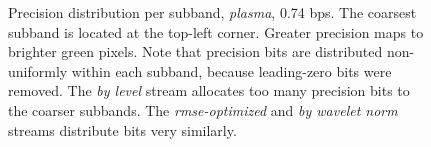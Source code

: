 \begin{figure}[h]
	\centering
	
	\caption{Precision distribution per subband, \emph{plasma}, 0.74 bps. The coarsest subband is located at the top-left corner. Greater precision maps to brighter green pixels. Note that precision bits are distributed non-uniformly within each subband, because leading-zero bits were removed. The \emph{by level} stream allocates too many precision bits to the coarser subbands. The \emph{rmse-optimized} and \emph{by wavelet norm} streams distribute bits very similarly.}
 	\label{fig:precision-map-rmse}
\end{figure}


